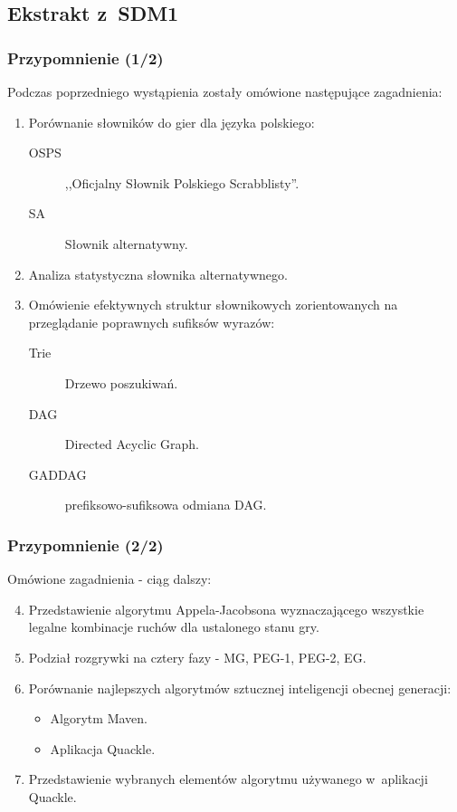 \documentclass[10pt,a4paper]{beamer}
\begin{document}
\subsection{Ekstrakt z~SDM1}

\begin{frame}
	\frametitle{Przypomnienie (1/2)}

	Podczas poprzedniego wystąpienia zostały omówione następujące zagadnienia:

	\begin{enumerate}
		\item Porównanie słowników do gier dla języka polskiego:
			\begin{description}
				\item[OSPS] ,,Oficjalny Słownik Polskiego Scrabblisty''.
				\item[SA] Słownik alternatywny.
			\end{description}
		\item Analiza statystyczna słownika alternatywnego.
		\item Omówienie efektywnych struktur słownikowych zorientowanych na przeglądanie poprawnych sufiksów wyrazów:
			\begin{description}
				\item[Trie] Drzewo poszukiwań.
				\item[DAG] Directed Acyclic Graph.
				\item[GADDAG] prefiksowo-sufiksowa odmiana DAG.
			\end{description}
	\end{enumerate}
\end{frame}

\begin{frame}
	\frametitle{Przypomnienie (2/2)}

	Omówione zagadnienia - ciąg dalszy:

	\begin{enumerate}
		\setcounter{enumi}{3}
		\item Przedstawienie algorytmu Appela-Jacobsona wyznaczającego wszystkie legalne kombinacje ruchów dla ustalonego stanu gry.
		\item Podział rozgrywki na cztery fazy - MG, PEG-1, PEG-2, EG.
		\item Porównanie najlepszych algorytmów sztucznej inteligencji obecnej generacji:
			\begin{itemize}
				\item Algorytm Maven.
				\item Aplikacja Quackle.
			\end{itemize}
		\item Przedstawienie wybranych elementów algorytmu używanego w~aplikacji Quackle.
	\end{enumerate}
\end{frame}
\end{document}
